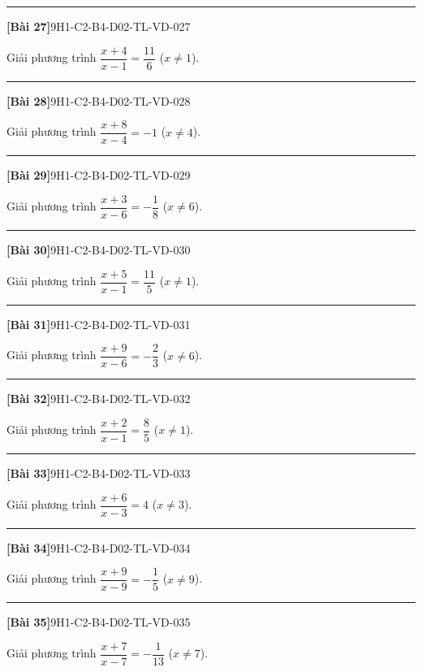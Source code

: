 \documentclass[12pt,a4paper]{article}
\newif\ifloigiai
\newenvironment{cauhoi}[2]{%
  \par\medskip\noindent\rule{\textwidth}{0.4pt}\par\nopagebreak
  \noindent\textbf{[#1]}\hfill{\scriptsize\ttfamily #2}\par\nopagebreak\smallskip}{\par}
\newcommand{\loigiai}[1]{\ifloigiai\par\smallskip\noindent\textit{Lời giải.} #1\par\fi}
\begin{document}
\begin{cauhoi}{Bài 27}{9H1-C2-B4-D02-TL-VD-027}
Giải phương trình $\dfrac{x+4}{x-1}=\dfrac{11}{6}$ ($x\ne 1$).
\loigiai{Điều kiện $x\ne 1$. Nhân hai vế với $x-1$: $x+4=\dfrac{11}{6}(x-1)$. Giải ta được $x=7$ (thoả điều kiện).}
\end{cauhoi}
\begin{cauhoi}{Bài 28}{9H1-C2-B4-D02-TL-VD-028}
Giải phương trình $\dfrac{x+8}{x-4}=-1$ ($x\ne 4$).
\loigiai{Điều kiện $x\ne 4$. Nhân hai vế với $x-4$: $x+8=-(x-4)$. Giải ta được $x=-2$ (thoả điều kiện).}
\end{cauhoi}
\begin{cauhoi}{Bài 29}{9H1-C2-B4-D02-TL-VD-029}
Giải phương trình $\dfrac{x+3}{x-6}=-\dfrac{1}{8}$ ($x\ne 6$).
\loigiai{Điều kiện $x\ne 6$. Nhân hai vế với $x-6$: $x+3=-\dfrac{1}{8}(x-6)$. Giải ta được $x=-2$ (thoả điều kiện).}
\end{cauhoi}
\begin{cauhoi}{Bài 30}{9H1-C2-B4-D02-TL-VD-030}
Giải phương trình $\dfrac{x+5}{x-1}=\dfrac{11}{5}$ ($x\ne 1$).
\loigiai{Điều kiện $x\ne 1$. Nhân hai vế với $x-1$: $x+5=\dfrac{11}{5}(x-1)$. Giải ta được $x=6$ (thoả điều kiện).}
\end{cauhoi}
\begin{cauhoi}{Bài 31}{9H1-C2-B4-D02-TL-VD-031}
Giải phương trình $\dfrac{x+9}{x-6}=-\dfrac{2}{3}$ ($x\ne 6$).
\loigiai{Điều kiện $x\ne 6$. Nhân hai vế với $x-6$: $x+9=-\dfrac{2}{3}(x-6)$. Giải ta được $x=-3$ (thoả điều kiện).}
\end{cauhoi}
\begin{cauhoi}{Bài 32}{9H1-C2-B4-D02-TL-VD-032}
Giải phương trình $\dfrac{x+2}{x-1}=\dfrac{8}{5}$ ($x\ne 1$).
\loigiai{Điều kiện $x\ne 1$. Nhân hai vế với $x-1$: $x+2=\dfrac{8}{5}(x-1)$. Giải ta được $x=6$ (thoả điều kiện).}
\end{cauhoi}
\begin{cauhoi}{Bài 33}{9H1-C2-B4-D02-TL-VD-033}
Giải phương trình $\dfrac{x+6}{x-3}=4$ ($x\ne 3$).
\loigiai{Điều kiện $x\ne 3$. Nhân hai vế với $x-3$: $x+6=4(x-3)$. Giải ta được $x=6$ (thoả điều kiện).}
\end{cauhoi}
\begin{cauhoi}{Bài 34}{9H1-C2-B4-D02-TL-VD-034}
Giải phương trình $\dfrac{x+9}{x-9}=-\dfrac{1}{5}$ ($x\ne 9$).
\loigiai{Điều kiện $x\ne 9$. Nhân hai vế với $x-9$: $x+9=-\dfrac{1}{5}(x-9)$. Giải ta được $x=-6$ (thoả điều kiện).}
\end{cauhoi}
\begin{cauhoi}{Bài 35}{9H1-C2-B4-D02-TL-VD-035}
Giải phương trình $\dfrac{x+7}{x-7}=-\dfrac{1}{13}$ ($x\ne 7$).
\loigiai{Điều kiện $x\ne 7$. Nhân hai vế với $x-7$: $x+7=-\dfrac{1}{13}(x-7)$. Giải ta được $x=-6$ (thoả điều kiện).}
\end{cauhoi}
\end{document}
